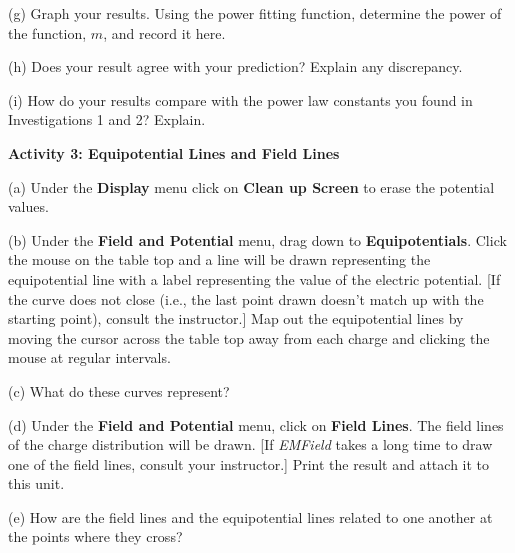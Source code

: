 (g) Graph your results. Using the power fitting
function, determine the power of the function, $m$, and record it here.
\vspace{15mm}

(h) Does your result agree with your prediction? Explain any discrepancy.
\vspace{15mm}

(i) How do your results compare with the power law constants you found
in Investigations 1 and 2? Explain.\vspace{15mm}


\textbf{Activity 3: Equipotential Lines and Field Lines}

(a) Under the \textbf{Display} menu click on \textbf{Clean up Screen} to erase the potential values.

(b) Under the \textbf{Field and Potential} menu, drag down to \textbf{Equipotentials}.
Click the mouse on the table top and a
line will be drawn representing the equipotential line with a label
representing the value of the electric potential. {[}If
the curve does not close (i.e., the last point drawn doesn't match
up with the starting point), consult the instructor.{]} Map out the
equipotential lines by moving the cursor across the table top away
from each charge and clicking the mouse at regular intervals.

(c) What do these curves represent?\vspace{15mm}

(d) Under the \textbf{Field and Potential} menu, click on \textbf{Field Lines}.
The field lines of the charge distribution will be drawn. {[}If \textit{EMField} takes a long time to draw one of the field lines, consult your instructor.{]}
Print the result and attach it to this unit.
 
(e) How are the field lines and the equipotential lines related to one
another at the points where they cross?


